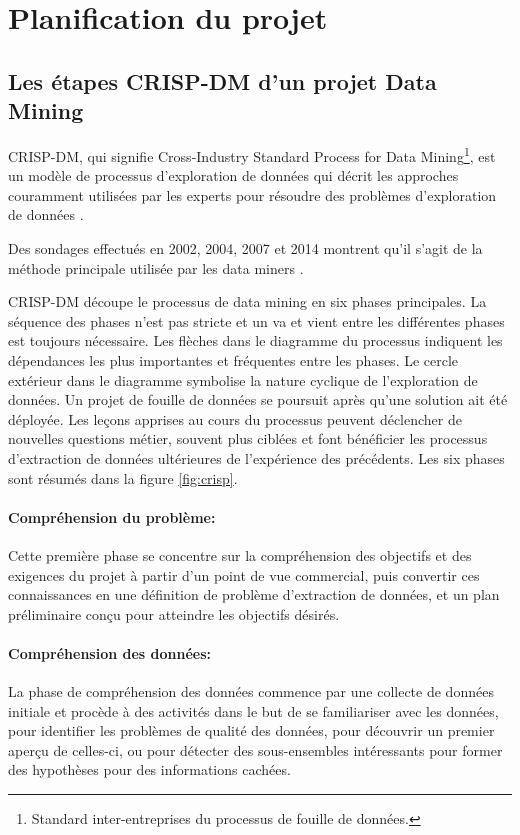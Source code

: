 \section{Planification du projet}
	\subsection{Les étapes CRISP-DM d'un projet Data Mining}
	CRISP-DM, qui signifie Cross-Industry Standard Process for Data Mining\footnote{Standard inter-entreprises du processus de fouille de données.}, est un modèle de processus d'exploration de données qui décrit les approches couramment utilisées par les experts pour résoudre des problèmes d'exploration de données \cite{CRISP-DM}.\par 
	Des sondages effectués en 2002, 2004, 2007 et 2014 montrent qu'il s'agit de la méthode principale utilisée par les data miners \cite{KDN}.\par
	
	CRISP-DM découpe le processus de data mining en six phases principales. La séquence des phases n'est pas stricte et un va et vient entre les différentes phases est toujours nécessaire. Les flèches dans le diagramme du processus indiquent les dépendances les plus importantes et fréquentes entre les phases. Le cercle extérieur dans le diagramme symbolise la nature cyclique de l'exploration de données. Un projet de fouille de données se poursuit après qu'une solution ait été déployée. Les leçons apprises au cours du processus peuvent déclencher de nouvelles questions métier, souvent plus ciblées et font bénéficier les processus d'extraction de données ultérieures de l'expérience des précédents. Les six phases sont résumés dans la figure \ref{fig:crisp}.
	\newpage
	\paragraph{Compréhension du problème:}
	Cette première phase se concentre sur la compréhension des objectifs et des exigences du projet à partir d'un point de vue commercial, puis convertir ces connaissances en une définition de problème d'extraction de données, et un plan préliminaire conçu pour atteindre les objectifs désirés.
	\paragraph{Compréhension des données:}
	La phase de compréhension des données commence par une collecte de données initiale et procède à des activités dans le but de se familiariser avec les données, pour identifier les problèmes de qualité des données, pour découvrir un premier aperçu de celles-ci, ou pour détecter des sous-ensembles intéressants pour former des hypothèses pour des informations cachées.
